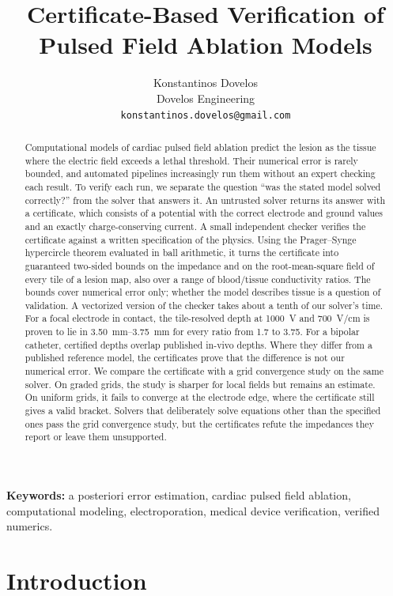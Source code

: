 \documentclass[11pt]{article}
\title{Certificate-Based Verification of Pulsed Field Ablation Models}
\author{Konstantinos Dovelos\\ \small Dovelos Engineering \\ \small \texttt{konstantinos.dovelos@gmail.com}}
\date{}
\begin{document}
\maketitle

\begin{abstract}
Computational models of cardiac pulsed field ablation predict the lesion as the
tissue where the electric field exceeds a lethal threshold. Their numerical
error is rarely bounded, and automated pipelines increasingly run them without
an expert checking each result. To verify each run, we separate the question
``was the stated model solved correctly?'' from the solver that answers it. An
untrusted solver returns its answer with a certificate, which consists of a potential
with the correct electrode and ground values and an exactly charge-conserving
current. A
small independent checker verifies the certificate against a written
specification of the physics. Using the Prager--Synge hypercircle theorem
evaluated in ball arithmetic, it turns the certificate into guaranteed
two-sided bounds on the impedance and on the root-mean-square field of every
tile of a lesion map, also over a range of blood/tissue conductivity ratios. The
bounds cover numerical error only; whether the model describes tissue is a
question of validation. A vectorized version of the checker takes about a tenth of our solver's time. For
a focal electrode in contact, the tile-resolved depth at \SI{1000}{V} and
\SI{700}{V/cm} is proven to lie in \SIrange{3.50}{3.75}{mm} for every ratio from
1.7 to 3.75. For a bipolar catheter, certified depths overlap published in-vivo
depths. Where they differ from a published reference model, the certificates
prove that the difference is not our numerical error. We compare
the certificate with a grid convergence study on the same solver. On graded grids,
the study is sharper for local fields but remains an estimate. On uniform grids, it
fails to converge at the electrode edge, where the certificate still gives a valid
bracket. Solvers that deliberately solve equations other than the specified ones
pass the grid convergence study, but the certificates refute the impedances they
report or leave them unsupported.
\end{abstract}

\noindent\textbf{Keywords:} a posteriori error estimation, cardiac pulsed field
ablation, computational modeling, electroporation, medical device verification,
verified numerics.

\section{Introduction}
\end{document}

